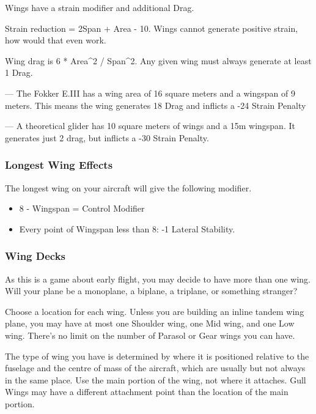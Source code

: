 \documentclass{article}
\begin{document}
Wings have a strain modifier and additional Drag.

Strain reduction = 2Span + Area - 10. Wings cannot generate positive
strain, how would that even work.

Wing drag is 6 * Area\^{}2 / Span\^{}2. Any given wing must always
generate at least 1 Drag.

--- The Fokker E.III has a wing area of 16 square
meters and a wingspan of 9 meters. This means the wing generates
18 Drag and inflicts a -24 Strain Penalty

--- A theoretical glider has 10 square meters of wings and a
15m wingspan. It generates just 2 drag,
but inflicts a -30 Strain Penalty.

\subsubsection{Longest Wing Effects}
\label{_Longest Wing Effects}

The longest wing on your aircraft will give the following modifier.

\begin{itemize}
  \item          8 - Wingspan = Control Modifier
  \item          Every point of Wingspan less than 8: -1 Lateral Stability.
\end{itemize}

\subsubsection{Wing Decks}
\label{_Wing Decks}

As this is a game about early flight, you may decide to have more than
one wing. Will your plane be a monoplane, a biplane, a triplane, or
something stranger?

Choose a location for each wing. Unless you are building an inline
tandem wing plane, you may have at most one Shoulder wing, one Mid wing,
and one Low wing. There's no limit on the number of Parasol or Gear
wings you can have.

The type of wing you have is determined by where it is positioned
relative to the fuselage and the centre of mass of the aircraft, which
are usually but not always in the same place.  Use the main portion of
the wing, not where it attaches.  Gull Wings may have a different attachment
point than the location of the main portion.
\end{document}
